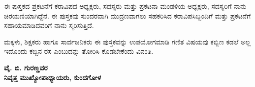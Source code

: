 {\medskip

ಈ ಪುಸ್ತಕದ ಪ್ರಕಟನೆಗೆ ಕರಾವಿಪದ ಅಧ್ಯಕ್ಷರು, ಸದಸ್ಯರು ಮತ್ತು ಪ್ರಕಟನಾ ಮಂಡಳಿಯ ಅಧ್ಯಕ್ಷರು, ಸದಸ್ಯರಿಗೆ ನಾನು ಚಿರಯಣಿಯಾಗಿದ್ದೆನೆ. ಈ ಪುಸ್ತಕವು ಸುಂದರವಾಗಿ ಮುದ್ರಣವಾಗಲು ಸಹಕರಿಸಿದ ಕರಾವಿಪಸಿಬ್ಬಂದಿಗೆ ಮತ್ತು ಪ್ರಕಟನೆಗೆ ಸಹಾಯಮಾಡಿದವರಿಗೆ ನಾನು ಸ್ಮರಿಸುತ್ತಿದೆ. 


ಮಕ್ಕಳು, ಶಿಕ್ಷಕರು ಹಾಗೂ ಸಾರ್ವಜನಿಕರು ಈ ಪುಸ್ತಕವನ್ನು ಉಪಯೋಗಮಾಡಿ ಗಣಿತ ವಿಷಯವು ಕಬ್ಬಿಣ ಕಡಲೆ ಅಲ್ಲ ಇದೊಂದು ಕಬ್ಬಿನ ರಸ ಎಂಬುದನ್ನು ತೋರಿಸಿ ಕೊಡಬೇಕೆಂದು ವಿನಂತಿ. 



\begin{flushright}
{\bf ವೈ. ಬಿ. ಗುರಣ್ಣವರ}\\
{\bf ನಿವೃತ್ತ ಮುಖ್ಯೋಪಾಧ್ಯಾಯರು,  ಕುಂದಗೋಳ}\\
\end{flushright}


}\relax
